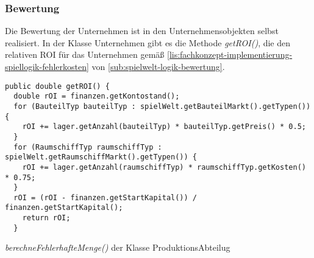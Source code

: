 \subsubsection{Bewertung}
\label{subsub:fachkonzept-implementierung-spiellogik-bewertung}

Die Bewertung der Unternehmen ist in den Unternehmensobjekten selbst realisiert. In der Klasse Unternehmen gibt es die Methode \textit{getROI()}, die den relativen ROI für das Unternehmen gemäß \ref{lis:fachkonzept-implementierung-spiellogik-fehlerkosten} von \ref{sub:spielwelt-logik-bewertung}.

\begin{programm}[ht]
\begin{lstlisting}[breaklines=true]
public double getROI() {
  double rOI = finanzen.getKontostand();
  for (BauteilTyp bauteilTyp : spielWelt.getBauteilMarkt().getTypen()) {
    rOI += lager.getAnzahl(bauteilTyp) * bauteilTyp.getPreis() * 0.5;
  }
  for (RaumschiffTyp raumschiffTyp : spielWelt.getRaumschiffMarkt().getTypen()) {
    rOI += lager.getAnzahl(raumschiffTyp) * raumschiffTyp.getKosten() * 0.75;
  }
  rOI = (rOI - finanzen.getStartKapital()) / finanzen.getStartKapital();
    return rOI;
  }
\end{lstlisting}
\caption{\textit{berechneFehlerhafteMenge()} der Klasse ProduktionsAbteilug\label{lis:fachkonzept-implementierung-spiellogik-fehlerkosten}}
\end{programm}